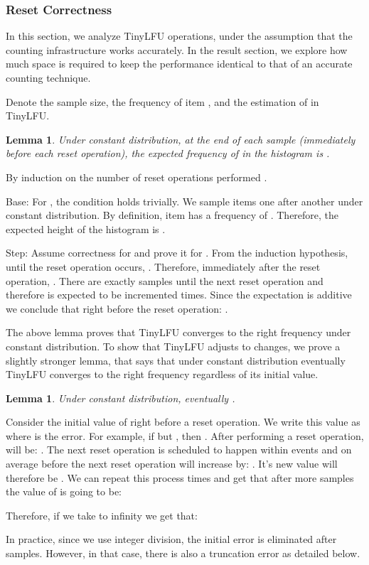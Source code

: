\documentclass[10pt,a4paper]{article}
\newtheorem{lemma}[theorem]{Lemma}
\newenvironment{proof}[1][IEEEproof]{\begin{trivlist}
\item[\hskip \labelsep {\bfseries #1}]}{\end{trivlist}}
\newenvironment{definition}[1][Definition]{\begin{trivlist}
\item[\hskip \labelsep {\bfseries #1}]}{\end{trivlist}}
\begin{document}
\subsubsection{Reset Correctness}
In this section, we analyze TinyLFU operations, under the assumption that the counting infrastructure works accurately. In the result section, we explore how much space is required to keep the performance identical to that of an accurate counting technique.

\begin{definition}
Denote  the sample size,  the frequency of item , and  the estimation of  in TinyLFU.
\end{definition}
\begin{lemma}
Under constant distribution, at the end of each sample (immediately before each reset operation), the expected frequency of  in the histogram is .
\end{lemma}
\begin{proof}
By induction on the number of reset operations performed .

Base: For , the condition holds trivially. We sample  items one after another under constant distribution. By definition, item  has a frequency of . Therefore, the expected height of the histogram is .

Step: Assume correctness for  and prove it for . From the induction hypothesis, until the  reset operation occurs, . Therefore,
immediately after the  reset operation, . There are exactly  samples until the next reset operation and therefore 
is expected to be incremented  times. Since the expectation is additive we conclude that right before the  reset operation: .
\end{proof}
The above lemma proves that TinyLFU converges to the right frequency under constant distribution.
To show that TinyLFU adjusts to changes, we prove a slightly stronger lemma, that says that under constant distribution eventually TinyLFU converges to the right frequency regardless of its initial value.

\begin{lemma}
	Under constant distribution, eventually .
\end{lemma}
\begin{proof}
	Consider the initial value of  right before a reset operation.
    We write this value as  where  is the error.
    For example, if  but , then .
    After performing a reset operation,  will be: .
    The next reset operation is scheduled to happen within  events and on average  before the next reset operation will increase by: .
    It's new value will therefore be .
	We can repeat this process  times and get that after  more samples the value of  is going to be:
	
	Therefore, if we take  to infinity we get that:
	
	In practice, since we use integer division, the initial error is eliminated after  samples.
    However, in that case, there is also a truncation error as detailed below.
\end{proof}
\end{document}
